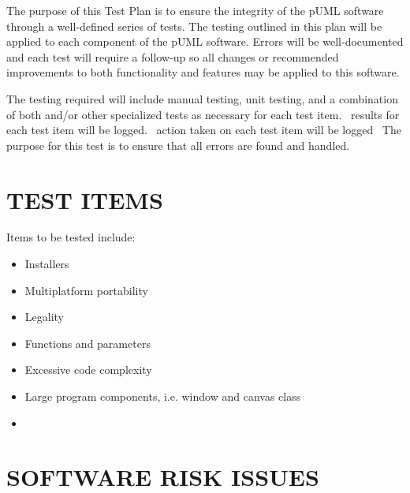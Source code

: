 \documentclass[twoside,letterpaper]{article}
\begin{document}
The purpose of this Test Plan is to ensure the integrity of the pUML software through a well-defined series of tests. The testing outlined in this plan will be applied to each component of the pUML software. Errors will be well-documented and each test will require a follow-up so all changes or recommended improvements to both functionality and features may be applied to this software.

\bigskip

The testing required will include manual testing, unit testing, and a combination of both and/or other specialized tests as necessary for each test item. 
\ results for each test item will be logged.
\ action taken on each test item will be logged
\ The purpose for this test is to ensure that all errors are found and handled. 

\section[TEST ITEMS]{\bfseries TEST ITEMS}

Items to be tested include:
\begin{itemize}
\item   Installers
\item   Multiplatform portability
\item   Legality
\item   Functions and parameters
\item   Excessive code complexity
\item   Large program components, i.e. window and canvas class
\item   
\end{itemize}

\section[SOFTWARE RISK ISSUES]{\bfseries SOFTWARE RISK ISSUES} 
\end{document}
